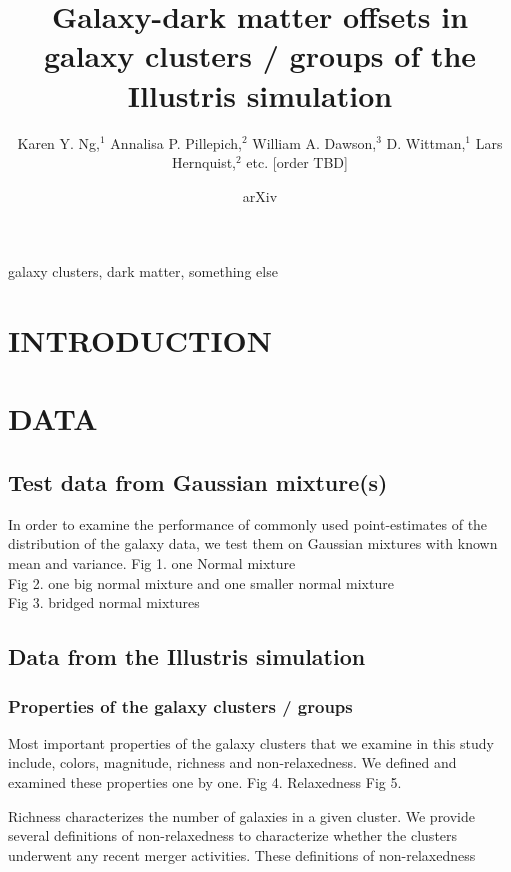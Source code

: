 \documentclass[letterpaper,useAMS,usenatbib]{mn2e}
\title[
	Galaxy-dark matter offsets in galaxy clusters / groups of the
Illustris simulation
]
{Galaxy-dark matter offsets in galaxy clusters / groups of the
Illustris simulation}
\author[Karen Y. Ng et al.]{Karen Y. Ng,$^{1}$
	Annalisa P. Pillepich,$^{2}$ 
	William A. Dawson,$^{3}$ 
	D. Wittman,$^{1}$
	\newauthor Lars Hernquist,$^{2}$
	etc. [order TBD]
}
\begin{document}
\date{arXiv} \pagerange{\pageref{firstpage}--\pageref{lastpage}}
 \maketitle\label{firstpage}
\begin{abstract} 
	
\end{abstract}
\begin{keywords}
	galaxy clusters, dark matter, something else 
\end{keywords}
\section{INTRODUCTION} 
\section{DATA}
\subsection{Test data from Gaussian mixture(s)}
In order to examine the performance of commonly used point-estimates of the
distribution of the galaxy data, we test them on Gaussian mixtures with
known mean and variance.
Fig 1. one Normal mixture \\  
Fig 2. one big normal mixture and one smaller normal mixture \\ 
Fig 3. bridged normal mixtures \\  

\subsection{Data from the Illustris simulation} 
\subsubsection{Properties of the galaxy clusters / groups}
Most important properties of the galaxy clusters that we examine in this
study include, colors, magnitude, richness and non-relaxedness. We defined
and examined these properties one by one. 
Fig 4. Relaxedness 
Fig 5. 

Richness characterizes the number of galaxies in a given cluster.
We provide several definitions of non-relaxedness to characterize whether
the clusters underwent any recent merger activities. These definitions of
non-relaxedness 
\end{document}
